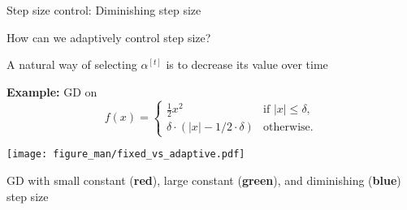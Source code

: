 \documentclass[11pt,compress,t,notes=noshow, xcolor=table]{beamer}
\begin{document}
	
	\begin{vbframe}{Step size control: Diminishing step size}

    	How can we adaptively control step size?

        \medskip
    
        A natural way of selecting $\alpha^{[t]}$ is to decrease its value over time

        \medskip
    	
    
        \textbf{Example:} GD on
        \begin{equation*}
            f(x) = 
            \begin{cases}
                \frac{1}{2} x^2 & \text{if $|x| \le \delta$}, \\
                \delta \cdot (|x|- 1 / 2 \cdot \delta) & \text{otherwise}.
            \end{cases}
        \end{equation*}
        \begin{center}
            \texttt{[image: figure\_man/fixed\_vs\_adaptive.pdf]} \\
            \begin{footnotesize}
                GD with small constant (\textbf{red}), large constant (\textbf{green}), and diminishing (\textbf{blue}) step size
            \end{footnotesize}
        \end{center}
		
	\end{vbframe}	
	
\end{document}
